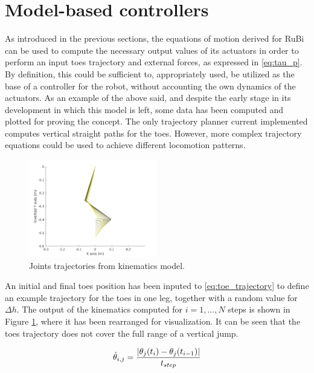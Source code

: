 
\section{Model-based controllers}
\label{sec_dynamic_controller}
As introduced in the previous sections, the equations of motion derived for RuBi can be used to compute the necessary output values of its actuators in order to perform an input toes trajectory and external forces, as expressed in \ref{eq:tau_p}.
By definition, this could be sufficient to, appropriately used, be utilized as the base of a controller for the robot, without accounting the own dynamics of the actuators.
As an example of the above said, and despite the early stage in its development in which this model is left, some data has been computed and plotted for proving the concept.
The only trajectory planner current implemented computes vertical straight paths for the toes.
However, more complex trajectory equations could be used to achieve different locomotion patterns.

\begin{figure}[htb]
	\centering
	\includegraphics[width=0.5\textwidth]{figures/kinematics_sim.pdf}
	\caption{Joints trajectories from kinematics model.}
	\label{fig:controller_position}
\end{figure}

An initial and final toes position has been inputed to \ref{eq:toe_trajectory} to define an example trajectory for the toes in one leg, together with a random value for $\Delta h$.
The output of the kinematics computed for $i=1,...,N$ steps is shown in Figure \ref{fig:controller_position}, where it has been rearranged for visualization.
It can be seen that the toes trajectory does not cover the full range of a vertical jump.

\begin{equation}
\label{eq:joint_vel}
	\dot{\theta}_{i,j} =\frac{ \lvert \theta_{j}(t_{i}) - \theta_{j}(t_{i-1}) \rvert }{ t_{step} }
\end{equation}

